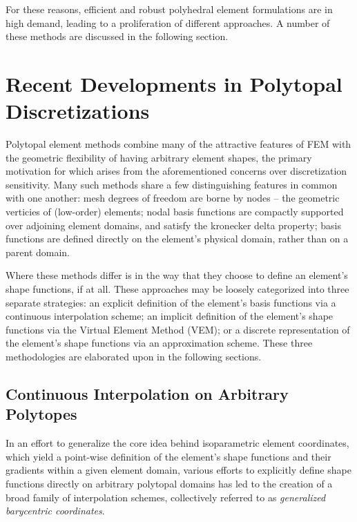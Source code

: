 	For these reasons, efficient and robust polyhedral element formulations are in high demand, leading to a proliferation of different approaches. A number of these methods are discussed in the following section.

\section{Recent Developments in Polytopal Discretizations} %

	Polytopal element methods combine many of the attractive features of FEM with the geometric flexibility of having arbitrary element shapes, the primary motivation for which arises from the aforementioned concerns over discretization sensitivity. Many such methods share a few distinguishing features in common with one another: mesh degrees of freedom are borne by nodes -- the geometric verticies of (low-order) elements; nodal basis functions are compactly supported over adjoining element domains, and satisfy the kronecker delta property; basis functions are defined directly on the element's physical domain, rather than on a parent domain.
	
	Where these methods differ is in the way that they choose to define an element's shape functions, if at all. These approaches may be loosely categorized into three separate strategies: an explicit definition of the element's basis functions via a continuous interpolation scheme; an implicit definition of the element's shape functions via the Virtual Element Method (VEM); or a discrete representation of the element's shape functions via an approximation scheme. These three methodologies are elaborated upon in the following sections.

	\subsection{Continuous Interpolation on Arbitrary Polytopes}
		In an effort to generalize the core idea behind isoparametric element coordinates, which yield a point-wise definition of the element's shape functions and their gradients within a given element domain, various efforts to explicitly define shape functions directly on arbitrary polytopal domains has led to the creation of a broad family of interpolation schemes, collectively referred to as \textit{generalized barycentric coordinates}.
		
